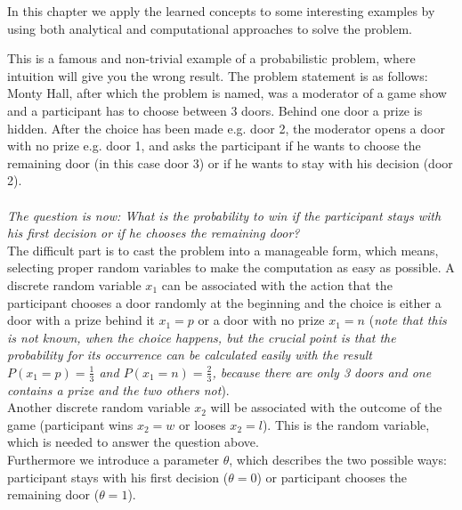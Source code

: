 \documentclass{tstextbook}
\begin{document}
In this chapter we apply the learned concepts to some interesting examples by using both analytical and computational approaches to solve the problem.

\begin{example}

This is a famous and non-trivial example of a probabilistic problem, where intuition will give you the wrong result. The problem statement is as follows:\\

Monty Hall, after which the problem is named, was a moderator of a game show and a participant has to choose between 3 doors. Behind one door a prize is hidden. After the choice has been made e.g. door 2, the moderator opens a door with no prize e.g. door 1, and asks the participant if he wants to choose the remaining door (in this case door 3) or if he wants to stay with his decision (door 2).
\\
\\
\textit{The question is now: What is the probability to win if the participant stays with his first decision or if he chooses the remaining door?}\\

The difficult part is to cast the problem into a manageable form, which means, selecting proper random variables to make the computation as easy as possible. 
A discrete random variable $x_1$ can be associated with the action that the participant chooses a door randomly at the beginning and the choice is either a door with a prize behind it $x_1=p$ or a door with no prize $x_1=n$ (\textit{note that this is not known, when the choice happens, but the crucial point is that the probability for its occurrence can be calculated easily with the result $P(x_1=p)=\frac{1}{3}$ and $P(x_1=n)=\frac{2}{3}$, because there are only 3 doors and one contains a prize and the two others not}).\\ 

Another discrete random variable $x_2$ will be associated with the outcome of the game (participant wins $x_2=w$ or looses $x_2=l$). This is the random variable, which is needed to answer the question above.\\
 
Furthermore we introduce a parameter $\theta$, which describes the two possible ways: participant stays with his first decision ($\theta=0$) or participant chooses the remaining door ($\theta=1$).\\


\end{example}
\end{document}
